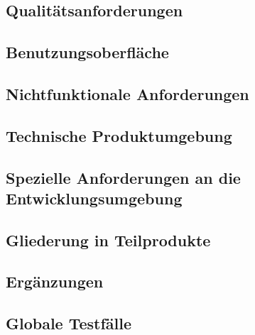 \subsection{Qualitätsanforderungen}

\subsection{Benutzungsoberfläche}

\subsection{Nichtfunktionale Anforderungen}

\subsection{Technische Produktumgebung}

\subsection{Spezielle Anforderungen an die Entwicklungsumgebung}

\subsection{Gliederung in Teilprodukte}

\subsection{Ergänzungen}

\subsection{Globale Testfälle}
